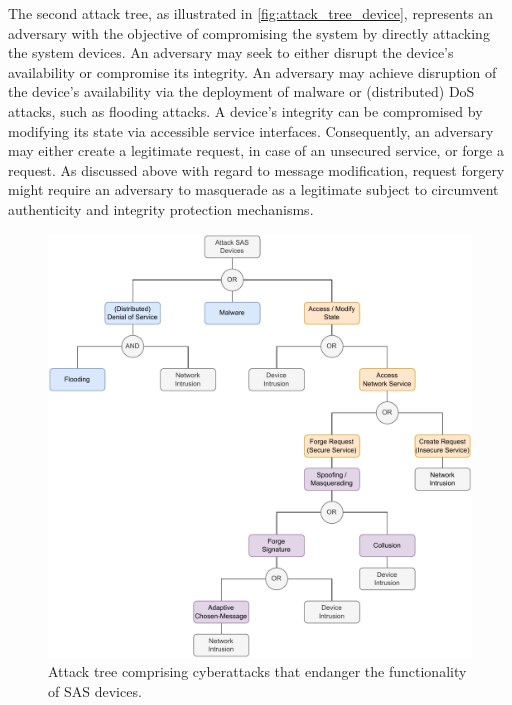 The second attack tree, as illustrated in \autoref{fig:attack_tree_device}, represents an adversary with the objective of compromising the system by directly attacking the system devices.
An adversary may seek to either disrupt the device's availability or compromise its integrity.
An adversary may achieve disruption of the device's availability via the deployment of malware or (distributed) DoS attacks, such as flooding attacks.
A device's integrity can be compromised by modifying its state via accessible service interfaces.
Consequently, an adversary may either create a legitimate request, in case of an unsecured service, or forge a request.
As discussed above with regard to message modification, request forgery might require an adversary to masquerade as a legitimate subject to circumvent authenticity and integrity protection mechanisms.
\begin{figure}
    \centering
    \includegraphics[width=1.0\linewidth]{figures/attack_tree_device.drawio.pdf}
    \caption{Attack tree comprising cyberattacks that endanger the functionality of SAS devices.}
    \label{fig:attack_tree_device}
\end{figure}

